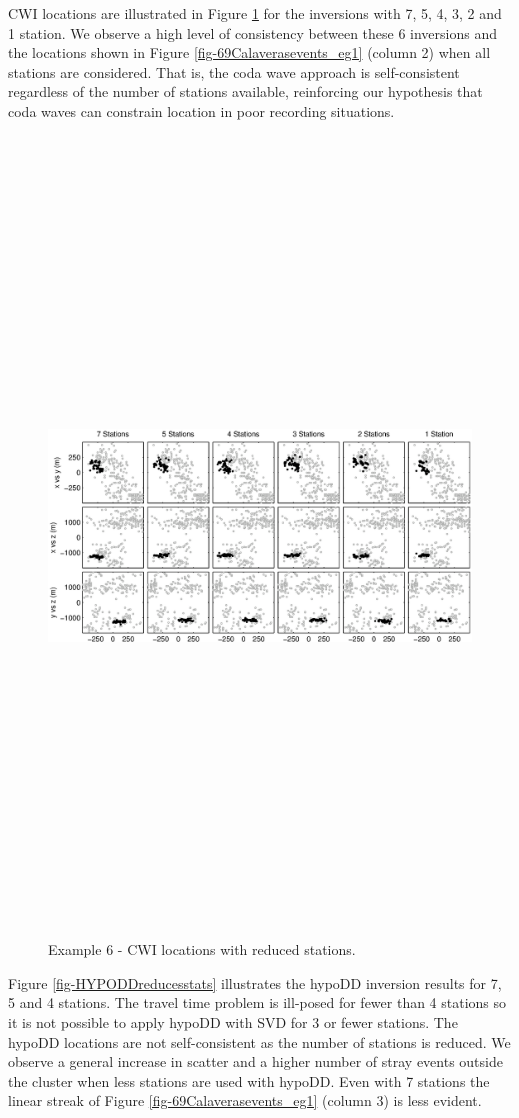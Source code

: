 \documentclass[extra, onecolumn, doublespacing]{gji}
\begin{document}
CWI locations are illustrated in Figure
\ref{fig-CWIreducesstats} for the inversions with 7, 5, 4, 3, 2 and
1 station. We observe a high level of consistency between these 6
inversions and the locations shown in Figure
\ref{fig-69Calaverasevents_eg1} (column 2) when all stations are
considered. That is, the coda wave approach is self-consistent
regardless of the number of stations available, reinforcing our
hypothesis that coda waves can constrain location in poor recording
situations.

\begin{figure}
\includegraphics[angle=90,height = 50pc]{diags/CalaverasLoc2.eps}
\caption{Example 6 - CWI locations with reduced stations.}
\label{fig-CWIreducesstats}
\end{figure}


Figure \ref{fig-HYPODDreducesstats} illustrates the hypoDD inversion
results for 7, 5 and 4 stations. The travel time problem is
ill-posed for fewer than 4 stations so it is not possible to apply
hypoDD with SVD for 3 or fewer stations.  The hypoDD locations are
not self-consistent as the number of stations is reduced. We observe
a general increase in scatter and a higher number of stray events
outside the cluster when less stations are used with hypoDD. Even
with 7 stations the linear streak of Figure
\ref{fig-69Calaverasevents_eg1} (column 3) is less evident.

\end{document}
